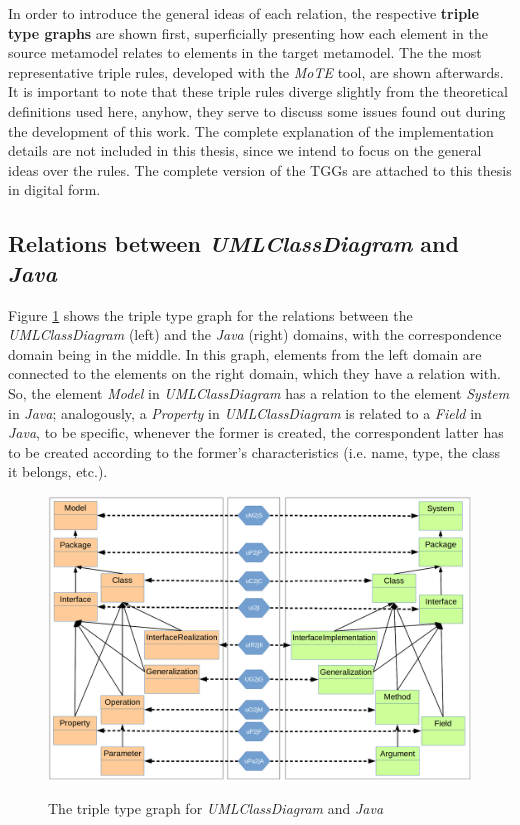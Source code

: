 \documentclass[tuberlin,cic,tc,english,noabntcite,oneside]{iiufrgs}
\begin{document}
In order to introduce the general ideas of each relation, the respective \textbf{triple type graphs} are shown first, superficially presenting how each element in the source metamodel relates to elements in the target metamodel. The the most representative triple rules, developed with the \emph{MoTE} tool, are shown afterwards. It is important to note that these triple rules diverge slightly from the theoretical definitions used here, anyhow, they serve to discuss some issues found out during the development of this work. The complete explanation of the implementation details are not included in this thesis, since we intend to focus on the general ideas over the rules. The complete version of the TGGs are attached to this thesis in digital form.

\subsection{Relations between \emph{UMLClassDiagram} and \emph{Java}}
\label{subsec:umlClassDiagram2Java}
Figure \ref{fig:umlClassDiagram2java_type} shows the triple type graph for the relations between the \emph{UMLClassDiagram} (left) and the \emph{Java} (right) domains, with the correspondence domain being in the middle. In this graph, elements from the left domain are connected to the elements on the right domain, which they have a relation with. So, the element \emph{Model} in \emph{UMLClassDiagram} has a relation to the element \emph{System} in \emph{Java}; analogously, a \emph{Property} in \emph{UMLClassDiagram} is related to a \emph{Field} in \emph{Java}, to be specific, whenever the former is created, the correspondent latter has to be created according to the former's characteristics (i.e. name, type, the class it belongs, etc.).

\begin{figure}[H]
	\centering
    \caption{The triple type graph for \emph{UMLClassDiagram} and \emph{Java}}
    \includegraphics[width=.7\textwidth]{umlClassDiagram2java_type}
    \label{fig:umlClassDiagram2java_type}
\end{figure}
\end{document}
